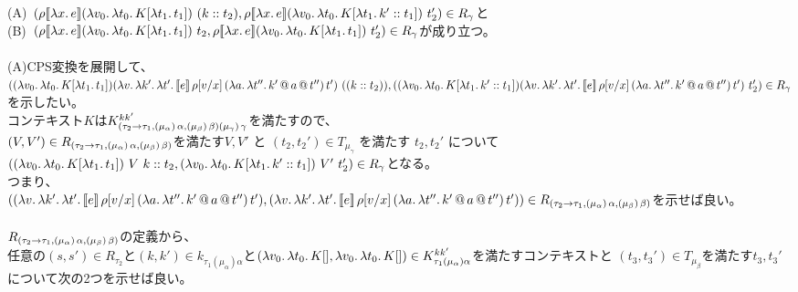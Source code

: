   (A)\ $(\rho \CPSTh{\Lam{x}{e}} \LamP{v_0}{\Lam{t_0}{K[\Lam{t_1}{t_1}]}}\ \ConsP{k}{t_2}, \rho \CPSTh{\Lam{x}{e}} \LamP{v_0}{\Lam{t_0}{K[\Lam{t_1}{\Cons{k'}{t_1}}]}}\ t_2')\in R_{\gamma}$と\\
  (B)\ $(\rho \CPSTh{\Lam{x}{e}} \LamP{v_0}{\Lam{t_0}{K[\Lam{t_1}{t_1}]}}\ t_2, \rho \CPSTh{\Lam{x}{e}} \LamP{v_0}{\Lam{t_0}{K[\Lam{t_1}{t_1}]}}\ t_2')\in R_{\gamma}$が成り立つ。\\
\\
(A)CPS変換を展開して、\\
$(\LamP{v_0}{\Lam{t_0}{K[\Lam{t_1}{t_1}]}}
          \LamP{v}{\Lam{k'}{\Lam{t'}{\CPS{e}{\rho[\Change{x}{v}]}
           {\LamP{a}{\Lam{t''}
               {\App{\App{k'}{a}}{t''}}}}{t'}}}}\ (\ConsP{k}{t_2}),\\
  (\LamP{v_0}{\Lam{t_0}{K[\Lam{t_1}{\Cons{k'}{t_1}}]}}
          \LamP{v}{\Lam{k'}{\Lam{t'}{\CPS{e}{\rho[\Change{x}{v}]}
           {\LamP{a}{\Lam{t''}
               {\App{\App{k'}{a}}{t''}}}}{t'}}}}\ t_2')\in R_{\gamma}$を示したい。\\
コンテキスト$K$は$K^{kk'}_{\ArrowTrailP{\tau_2}{\tau_1}{\TrailType{\alpha}}{\TrailType{\beta}} \TrailType{\gamma}}$を満たすので、\\
$(V,V')\in R_{\ArrowTrailP{\tau_2}{\tau_1}{\TrailType{\alpha}}{\TrailType{\beta}}}$を満たす$V,V'$ と $(t_2, t_2') \in T_{\mu_{\gamma}}$ を満たす $t_2, t_2'$ について\\
$(\LamP{v_0}{\Lam{t_0}{K[\Lam{t_1}{t_1}]}}\ V\ \Cons{k}{t_2}, \LamP{v_0}{\Lam{t_0}{K[\Lam{t_1}{\Cons{k'}{t_1}}]}}\ V'\ t_2')\in R_{\gamma}$となる。\\
つまり、\\
      $(\LamP{v}{\Lam{k'}{\Lam{t'}{\CPS{e}{\rho[\Change{x}{v}]}
           {\LamP{a}{\Lam{t''}
               {\App{\App{k'}{a}}{t''}}}}{t'}}}},\\
         \LamP{v}{\Lam{k'}{\Lam{t'}{\CPS{e}{\rho[\Change{x}{v}]}
           {\LamP{a}{\Lam{t''}
               {\App{\App{k'}{a}}{t''}}}}{t'}}}})\in R_{\ArrowTrailP{\tau_2}{\tau_1}{\TrailType{\alpha}}{\TrailType{\beta}}}$を示せば良い。\\
\\
$R_{\ArrowTrailP{\tau_2}{\tau_1}{\TrailType{\alpha}}{\TrailType{\beta}}}$の定義から、\\
任意の$(s,s')\in R_{\tau_2}$と$(k,k')\in k_{\tau_1(\mu_{\alpha})\alpha}$と$(\Lam{v_0}{\Lam{t_0}{K[]}}, \Lam{v_0}{\Lam{t_0}{K[]}})\in  K^{kk'}_{\tau_1(\mu_{\alpha})\alpha}$を満たすコンテキストと
$(t_3,t_3')\in T_{\mu_{\beta}}$を満たす$t_3, t_3'$について次の2つを示せば良い。\\

